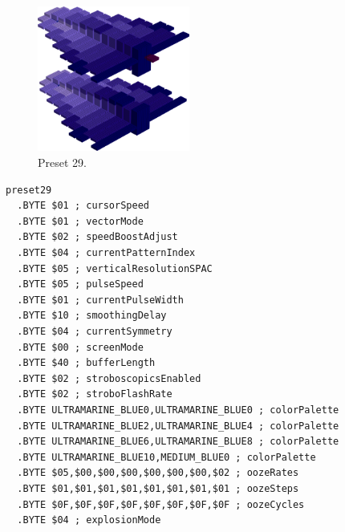 \vspace*{-0.5cm}
\begin{minipage}[b]{0.48\linewidth}
\begin{figure}[H]                                                          
  \centering                                                             
  \begin{adjustbox}{width=5cm,center}                                   
  \includegraphics[width=5cm]{src/colorspace_presets/preset29-45.png}%
  \end{adjustbox}                                                        
\caption*{Preset 29.}                                           
\end{figure}                                                               
\end{minipage}
\hspace{0.1cm}
\begin{minipage}[b]{0.48\linewidth}                                                                         
\begin{lstlisting}[basicstyle=\ttfamily\tiny]
preset29
  .BYTE $01 ; cursorSpeed
  .BYTE $01 ; vectorMode
  .BYTE $02 ; speedBoostAdjust
  .BYTE $04 ; currentPatternIndex
  .BYTE $05 ; verticalResolutionSPAC
  .BYTE $05 ; pulseSpeed
  .BYTE $01 ; currentPulseWidth
  .BYTE $10 ; smoothingDelay
  .BYTE $04 ; currentSymmetry
  .BYTE $00 ; screenMode
  .BYTE $40 ; bufferLength
  .BYTE $02 ; stroboscopicsEnabled
  .BYTE $02 ; stroboFlashRate
  .BYTE ULTRAMARINE_BLUE0,ULTRAMARINE_BLUE0 ; colorPalette
  .BYTE ULTRAMARINE_BLUE2,ULTRAMARINE_BLUE4 ; colorPalette
  .BYTE ULTRAMARINE_BLUE6,ULTRAMARINE_BLUE8 ; colorPalette
  .BYTE ULTRAMARINE_BLUE10,MEDIUM_BLUE0 ; colorPalette
  .BYTE $05,$00,$00,$00,$00,$00,$00,$02 ; oozeRates
  .BYTE $01,$01,$01,$01,$01,$01,$01,$01 ; oozeSteps
  .BYTE $0F,$0F,$0F,$0F,$0F,$0F,$0F,$0F ; oozeCycles
  .BYTE $04 ; explosionMode
\end{lstlisting}
\end{minipage}


